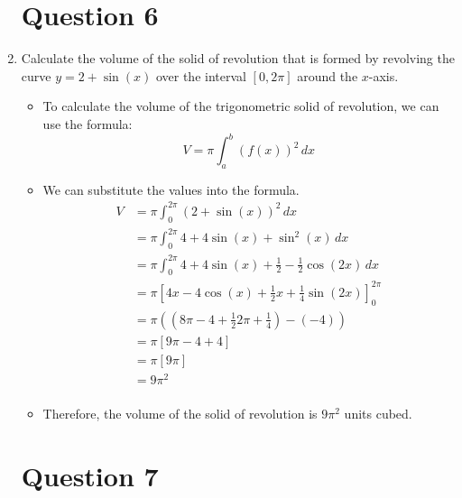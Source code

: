\documentclass[12pt]{article}
\begin{document}
\begin{enumerate}[leftmargin=\labelsep]
    \newpage

    \section*{Question 6}

    \item Calculate the volume of the solid of revolution that is formed by revolving the curve $y=2+\sin (x)$ over the interval $[0, 2\pi]$ around the $x$-axis.
    \begin{itemize}[label={}]
        \item To calculate the volume of the trigonometric solid of revolution, we can use the formula:
        \begin{equation*}
            \displaystyle{V = \pi \int_{a}^{b} (f(x))^2 \, dx}
        \end{equation*}
        \item We can substitute the values into the formula.
        \begin{equation*}
            \begin{split}
                V &= \pi \int_{0}^{2\pi} (2+\sin (x))^2 \, dx \\
                &= \pi \int_{0}^{2\pi} 4 + 4\sin (x) + \sin^2 (x) \, dx \\
                &= \pi \int_{0}^{2\pi} 4 + 4\sin (x) + \frac{1}{2} - \frac{1}{2} \cos (2x) \, dx \\
                &= \pi \left[ 4x - 4\cos (x) + \frac{1}{2} x + \frac{1}{4} \sin (2x) \right]_{0}^{2\pi} \\
                &= \pi \left( \left( 8\pi - 4 + \frac{1}{2} 2\pi + \frac{1}{4}\right) - \left( -4 \right)   \right) \\
                &= \pi \left[ 9\pi -4 +4 \right] \\
                &= \pi \left[ 9\pi \right] \\
                &= 9\pi^2 \\
            \end{split}
        \end{equation*}
        \item Therefore, the volume of the solid of revolution is $9\pi^2$ units cubed.
    \end{itemize}

    \newpage

    \section*{Question 7}
    

\end{enumerate}
\end{document}
